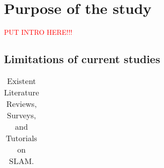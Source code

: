 \section{Purpose of the study}
\label{sec:purpose}

\textcolor{red}{PUT INTRO HERE!!!}





\subsection{Limitations of current studies}



\begin{table}[h]
  \caption[Existent Literature Reviews, Surveys, and Tutorials on SLAM.]{Existent Literature Reviews, Surveys, and Tutorials on SLAM.}
  \label{tab:purpose:current-literature}
  \centering
  {\scriptsize
  \begin{tabular}{c p{} p{}}


\end{tabular}}
\end{table}
